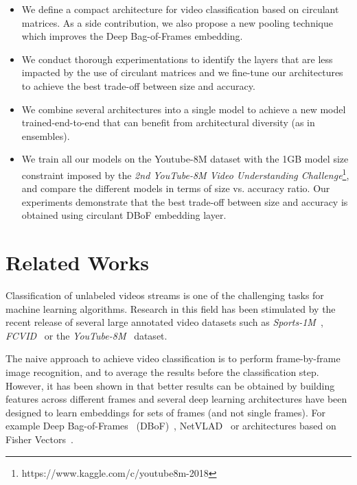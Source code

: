 \documentclass[runningheads]{llncs}
\newcommand{\yt}{\textit{YouTube-8M}\xspace}
\begin{document}
\begin{itemize}[noitemsep, topsep=0pt]
  \item We define a compact architecture for video classification based on circulant matrices. As a side contribution, we also propose a new pooling technique which improves the Deep Bag-of-Frames embedding.
  \item We conduct thorough experimentations to identify the layers that are less impacted by the use of circulant matrices and we fine-tune our architectures to achieve the best trade-off between size and accuracy.
  \item We combine several architectures into a single model to achieve a new model trained-end-to-end that can benefit from architectural diversity (as in ensembles).
  \item We train all our models on the Youtube-8M dataset with the 1GB model size constraint imposed by the \textit{2nd YouTube-8M Video Understanding Challenge}\footnote{https://www.kaggle.com/c/youtube8m-2018}, and compare the different models in terms of size vs. accuracy ratio. Our experiments demonstrate that the best trade-off between size and accuracy is obtained using circulant DBoF embedding layer.


\end{itemize}

\section{Related Works}
\label{sec:related-work}

Classification of unlabeled videos streams is one of the challenging tasks for machine learning algorithms.  Research in this field has been stimulated by the recent release of several large annotated video datasets such as \textit{Sports-1M}~\cite{karpathy2014large}, \textit{FCVID}~\cite{FCVID} or the \yt~\cite{45619} dataset.

The naive approach to achieve video classification is to perform frame-by-frame image recognition, and to average the results before the classification step. However, it has been shown in \cite{45619,DBLP:journals/corr/MiechLS17} that  better results can be obtained by building features across different frames and several deep learning architectures have been designed to learn embeddings for sets of frames (and not single frames). For example Deep Bag-of-Frames ~(DBoF)~\cite{45619}, NetVLAD~\cite{Arandjelovic16} or architectures based on Fisher Vectors~\cite{4270291}.
\end{document}
